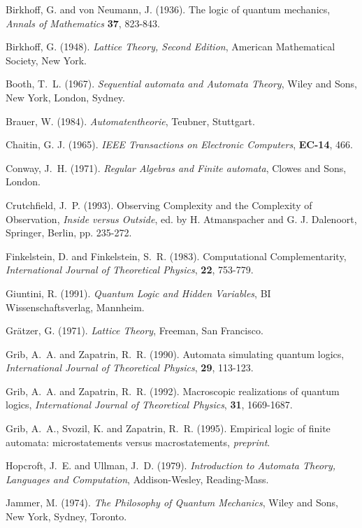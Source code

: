 \begin{thebibliography}{bib}
Birkhoff, G. and von Neumann, J. (1936). The logic of
quantum mechanics,
{\em Annals of Mathematics} {\bf 37}, 823-843.

Birkhoff, G. (1948). {\sl Lattice Theory, Second Edition}, American
 Mathematical Society, New York.

Booth, T.~L. (1967). {\em Sequential automata and Automata Theory},
Wiley and Sons, New York, London, Sydney.


Brauer, W. (1984). {\em Automatentheorie},
Teubner, Stuttgart.


Chaitin, G. J. (1965). {\sl IEEE Transactions on Electronic
Computers},
{\bf EC-14},
466.


Conway, J.~H. (1971). {\em Regular Algebras and Finite automata},
Clowes and Sons, London.

Crutchfield, J.~P. (1993). Observing Complexity and the Complexity of
Observation,
{\em Inside versus Outside}, ed. by H. Atmanspacher and G. J.
Dalenoort, Springer, Berlin, pp.
235-272.

Finkelstein, D. and Finkelstein, S.~R. (1983). Computational
Complementarity,
{\em International Journal of Theoretical Physics},
{\bf 22}, 753-779.

Giuntini, R. (1991). {\sl Quantum Logic and Hidden Variables},
BI Wissenschaftsverlag, Mannheim.

Gr\"atzer, G. (1971). {\em Lattice Theory}, Freeman, San Francisco.

Grib, A.~A. and Zapatrin, R.~R. (1990).
 Automata simulating
quantum logics,
{\em International Journal of Theoretical Physics},
{\bf 29}, 113-123.

Grib, A.~A. and Zapatrin, R.~R. (1992).
Macroscopic realizations of
quantum logics,
{\em International Journal of Theoretical Physics},
{\bf 31}, 1669-1687.

Grib, A.~A., Svozil, K. and Zapatrin, R.~R. (1995).
Empirical logic of finite automata: microstatements versus
macrostatements,
{\em preprint}.


Hopcroft, J.~E. and Ullman, J.~D. (1979).
 {\em Introduction to Automata
Theory, Languages and Computation},
Addison-Wesley, Reading-Mass.

Jammer, M. (1974). {\em The Philosophy of Quantum Mechanics},
Wiley and Sons, New York, Sydney, Toronto.


\end{thebibliography}
